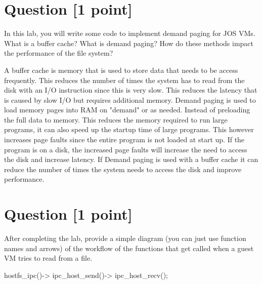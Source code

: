 \documentclass[11pt]{article}
\begin{document}
\section{Question [1 point]}

In this lab, you will write some code to implement demand paging for JOS VMs. What is a buffer cache? What is demand paging? How do these methods impact the performance of the file system?

\begin{solution}
A buffer cache is memory that is used to store data that needs to be access frequently.
This reduces the number of times the system has to read from the disk with an I/O instruction since this is very slow.
This reduces the latency that is caused by slow I/O but requires additional memory.
Demand paging is used to load memory pages into RAM on "demand" or as needed. Instead of preloading the full data to memory.
This reduces the memory required to run large programs, it can also speed up the startup time of large programs.
This however increases page faults since the entire program is not loaded at start up. If the program is on a disk, the increased page faults will increase the need to access the disk and increase latency. 
If Demand paging is used with a buffer cache it can reduce the number of times the system needs to access the disk and improve performance.
\end{solution}


\section{Question [1 point]}

After completing the lab, provide a simple diagram (you can just use function names and arrows) 
of the workflow of the functions that get called when a guest VM tries to read from a file.

\begin{solution}
hostfs_ipc()->
ipc_host_send()->
ipc_host_recv();
\end{solution}
\end{document}
